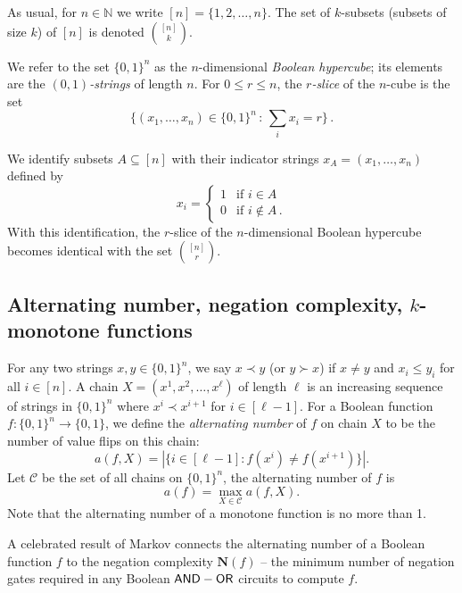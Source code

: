 \documentclass[11pt]{article}
\numberwithin{equation}{section}
\theoremstyle{definition}
\theoremstyle{plain}
\newcommand{\N}{\mathbb N}
\newcommand{\cC}{\mathcal{C}}
\begin{document}
As usual, for $n\in \N$ we write $[n]=\{1,2,\dots, n\}$.  The set of
$k$-subsets (subsets of size $k$) of $[n]$ is denoted $\binom{[n]}{k}$.

We refer to the set $\{0,1\}^n$ as the $n$-dimensional \emph{Boolean hypercube};
its elements are the \emph{$(0,1)$-strings} of length $n$.   
For $0\le r\le n$, the \emph{$r$-slice} of the $n$-cube is the set
\begin{equation}
\{(x_1,\ldots,x_n)\in\{0,1\}^n\,:\,\sum_i{x_i}=r\}\,.
\end{equation}
    
We identify subsets $A\subseteq [n]$ with their indicator strings
$x_A=(x_1,\dots,x_n)$ defined by
\begin{equation}
   x_i = \begin{cases} 1 & \mbox{if } i\in A\\
                       0 & \mbox{if } i\notin A\,.
         \end{cases}
\end{equation}
With this identification, the $r$-slice of the $n$-dimensional
Boolean hypercube becomes identical with the set $\binom{[n]}{r}$.   
%

%
\subsection{Alternating number, negation complexity, $k$-monotone functions}
\label{sec:k-mon}

%
%
For any two strings $x, y \in \{0, 1\}^n$, we say $x \prec y$
(or $y \succ x$) %
%
if   %
$x \neq y$ and $x_i \le y_i$ for all $i \in [n]$. 
A chain $X = (x^1, x^2, \dots, x^\ell)$ of length $\ell$ is an increasing sequence of strings in $\{0, 1\}^n$
where $x^i \prec x^{i+1}$ for $i \in [\ell - 1]$.
For a Boolean function $f:\{0,1\}^n\rightarrow \{0, 1\}$, we define the 
\emph{alternating number} %
of $f$
on chain $X$ to be the number of value flips on this chain:
\begin{equation}
a(f, X) = \left| \{i \in [\ell - 1] : f(x^i) \neq f(x^{i+1})\}\right|.
\end{equation}
Let $\cC$ be the set of all chains on $\{0, 1\}^n$, the alternating number of $f$ is
\begin{equation}
a(f) = \max_{X \in \cC} a(f, X).
\end{equation}
Note that the alternating number of a monotone function is no more than 1.

A celebrated result of Markov connects the alternating number of a Boolean function $f$ to the
negation complexity $\mathbf{N}(f)$ -- the minimum number of negation gates required in any
Boolean $\sf{AND}-\sf{OR}$ circuits to compute $f$.
\end{document}
